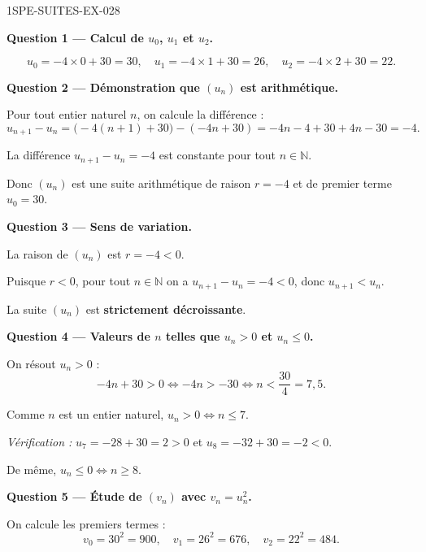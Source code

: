 \begin{corrige}{1SPE-SUITES-EX-028}

\textbf{Question 1 — Calcul de $u_0$, $u_1$ et $u_2$.}

\[
  u_0 = -4 \times 0 + 30 = 30, \quad u_1 = -4 \times 1 + 30 = 26, \quad u_2 = -4 \times 2 + 30 = 22.
\]

\medskip
\textbf{Question 2 — Démonstration que $(u_n)$ est arithmétique.}

Pour tout entier naturel $n$, on calcule la différence :
\[
  u_{n+1} - u_n = \bigl(-4(n+1) + 30\bigr) - (-4n + 30) = -4n - 4 + 30 + 4n - 30 = -4.
\]


La différence $u_{n+1} - u_n = -4$ est constante pour tout $n \in \mathbb{N}$.

Donc $(u_n)$ est une suite arithmétique de raison $r = -4$ et de premier terme $u_0 = 30$.

\medskip
\textbf{Question 3 — Sens de variation.}

La raison de $(u_n)$ est $r = -4 < 0$.


Puisque $r < 0$, pour tout $n \in \mathbb{N}$ on a $u_{n+1} - u_n = -4 < 0$, donc $u_{n+1} < u_n$.

La suite $(u_n)$ est \textbf{strictement décroissante}.

\medskip
\textbf{Question 4 — Valeurs de $n$ telles que $u_n > 0$ et $u_n \leq 0$.}

On résout $u_n > 0$ :
\[
  -4n + 30 > 0 \iff -4n > -30 \iff n < \frac{30}{4} = 7{,}5.
\]

Comme $n$ est un entier naturel, $u_n > 0 \iff n \leq 7$.

\textit{Vérification :} $u_7 = -28 + 30 = 2 > 0$ et $u_8 = -32 + 30 = -2 < 0$. \checkmark

De même, $u_n \leq 0 \iff n \geq 8$.


\medskip
\textbf{Question 5 — Étude de $(v_n)$ avec $v_n = u_n^2$.}

On calcule les premiers termes :
\[
  v_0 = 30^2 = 900, \quad v_1 = 26^2 = 676, \quad v_2 = 22^2 = 484.
\]


\end{corrige}
